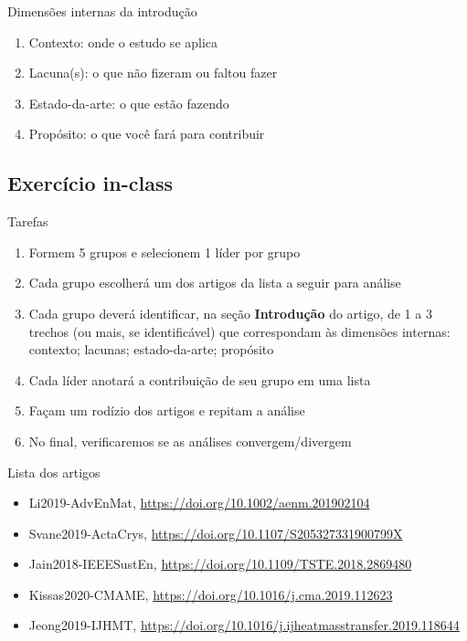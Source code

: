 \begin{frame}{Dimensões internas da introdução}
\begin{enumerate}
\item Contexto: onde o estudo se aplica
\item Lacuna(s): o que não fizeram ou faltou fazer
\item Estado-da-arte: o que estão fazendo 
\item Propósito: o que você fará para contribuir
\end{enumerate}
\end{frame}


\subsection{Exercício in-class}

\begin{frame}{Tarefas}
\begin{enumerate}
\item Formem 5 grupos e selecionem 1 líder por grupo
\item Cada grupo escolherá um dos artigos da lista a seguir para análise
\item Cada grupo deverá identificar, na seção \textbf{Introdução} do artigo, de 1 a 3 trechos (ou mais, se identificável) que correspondam às dimensões internas: contexto; lacunas; estado-da-arte; propósito
\item Cada líder anotará a contribuição de seu grupo em uma lista
\item Façam um rodízio dos artigos e repitam a análise 
\item No final, verificaremos se as análises convergem/divergem
\end{enumerate}
\end{frame}

\begin{frame}{Lista dos artigos} 
\begin{itemize}
\item Li2019-AdvEnMat, \url{ https://doi.org/10.1002/aenm.201902104}
\item Svane2019-ActaCrys, \url{https://doi.org/10.1107/S205327331900799X}
\item Jain2018-IEEESustEn, \url{https://doi.org/10.1109/TSTE.2018.2869480}
\item Kissas2020-CMAME,  \url{https://doi.org/10.1016/j.cma.2019.112623}
\item Jeong2019-IJHMT,  \url{https://doi.org/10.1016/j.ijheatmasstransfer.2019.118644}
\end{itemize}
\end{frame}


